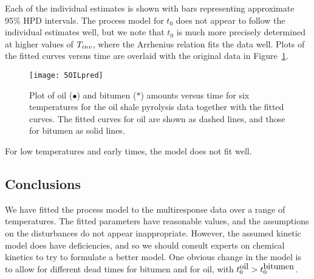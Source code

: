 Each of the individual estimates is shown with bars representing
approximate 95\% HPD intervals.
The process model for $t_{0}$ does not appear to follow the individual
estimates well, but we note that $t_{0}$ is much more
precisely determined at higher values of $T_{{{\rm }} inv }$,
where the Arrhenius relation fits the data well.
Plots of the fitted curves versus time are overlaid with the
original data in Figure~\ref{fig:OILpred}.
\begin{figure}
  \centerline{\texttt{[image: 5OILpred]}}%
  \caption{\label{fig:OILpred}
  Plot of oil ($\bullet$) and bitumen ($*$) amounts versus time
  for six temperatures for the oil shale pyrolysis data together with
  the fitted curves.  The fitted curves for oil are shown as dashed
  lines, and those for bitumen as solid lines.
  }
\end{figure}
For low temperatures and early times, the model does not fit well.

\subsection{Conclusions}

We have fitted the process model to the multiresponse data over a
range of temperatures.
The fitted parameters have reasonable values, and the assumptions
on the disturbances do not appear inappropriate.
However, the assumed kinetic model does have deficiencies, and so we
should consult experts on chemical kinetics to try to formulate
a better model.
One obvious change in the model is to allow for different dead times
for bitumen and for oil, with
$t_0^{\mbox{\rm oil}}>t_0^{\mbox{\rm bitumen}}$.

